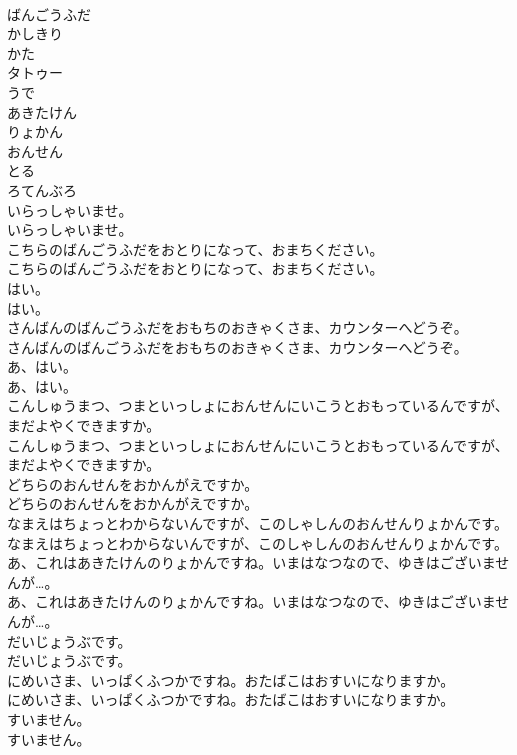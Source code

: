 \documentclass[8pt]{extreport}
\begin{document}
\begin{CJK}{UTF8}{min}
\\	ばんごうふだ
\\	かしきり
\\	かた
\\	タトゥー
\\	うで
\\	あきたけん
\\	りょかん
\\	おんせん
\\	とる
\\	ろてんぶろ
\\	いらっしゃいませ。	
\\	いらっしゃいませ。 
\\	こちらのばんごうふだをおとりになって、おまちください。	
\\	こちらのばんごうふだをおとりになって、おまちください。 
\\	はい。	
\\	はい。 
\\	さんばんのばんごうふだをおもちのおきゃくさま、カウンターへどうぞ。	
\\	さんばんのばんごうふだをおもちのおきゃくさま、カウンターへどうぞ。 
\\	あ、はい。	
\\	あ、はい。 
\\	こんしゅうまつ、つまといっしょにおんせんにいこうとおもっているんですが、まだよやくできますか。	
\\	こんしゅうまつ、つまといっしょにおんせんにいこうとおもっているんですが、まだよやくできますか。 
\\	どちらのおんせんをおかんがえですか。	
\\	どちらのおんせんをおかんがえですか。 
\\	なまえはちょっとわからないんですが、このしゃしんのおんせんりょかんです。	
\\	なまえはちょっとわからないんですが、このしゃしんのおんせんりょかんです。 
\\	あ、これはあきたけんのりょかんですね。いまはなつなので、ゆきはございませんが…。	
\\	あ、これはあきたけんのりょかんですね。いまはなつなので、ゆきはございませんが…。 
\\	だいじょうぶです。	
\\	だいじょうぶです。 
\\	にめいさま、いっぱくふつかですね。おたばこはおすいになりますか。	
\\	にめいさま、いっぱくふつかですね。おたばこはおすいになりますか。 
\\	すいません。	
\\	すいません。 

\end{CJK}
\end{document}

